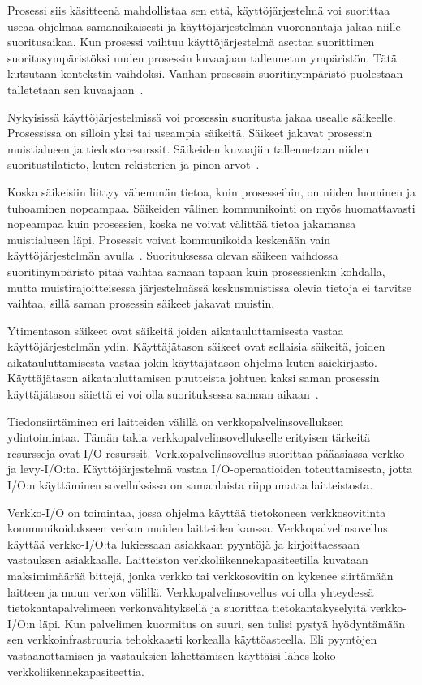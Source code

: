\documentclass[finnish]{tktltiki2}
\theoremstyle{definition}
\theoremstyle{remark}
\begin{document}
Prosessi siis käsitteenä mahdollistaa sen että, käyttöjärjestelmä
voi suorittaa useaa ohjelmaa samanaikaisesti ja käyttöjärjestelmän
vuoronantaja jakaa niille suoritusaikaa. Kun prosessi vaihtuu
käyttöjärjestelmä asettaa suorittimen suoritusympäristöksi
uuden prosessin kuvaajaan tallennetun ympäristön. Tätä kutsutaan kontekstin
vaihdoksi. Vanhan prosessin suoritinympäristö puolestaan talletetaan sen
kuvaajaan~\cite{stallings_operating_2018}.

Nykyisissä käyttöjärjestelmissä voi prosessin suoritusta jakaa usealle
säikeelle. Prosessissa on silloin yksi tai useampia säikeitä.
Säikeet jakavat prosessin muistialueen ja tiedostoresurssit.
Säikeiden kuvaajiin
tallennetaan niiden suoritustilatieto,
kuten rekisterien ja pinon arvot~\cite{stallings_operating_2018}.

Koska säikeisiin liittyy vähemmän tietoa, kuin prosesseihin,
on niiden luominen ja tuhoaminen nopeampaa. Säikeiden välinen
kommunikointi on myös huomattavasti nopeampaa kuin prosessien, koska
ne voivat välittää tietoa jakamansa muistialueen läpi.
Prosessit voivat kommunikoida keskenään vain käyttöjärjestelmän
avulla~\cite{stallings_operating_2018}.
Suorituksessa olevan säikeen
vaihdossa suoritinympäristö pitää vaihtaa
samaan tapaan kuin prosessienkin kohdalla, mutta muistirajoitteisessa
järjestelmässä keskusmuistissa olevia
tietoja ei tarvitse vaihtaa, sillä saman prosessin säikeet jakavat
muistin.

Ytimentason säikeet ovat säikeitä joiden aikatauluttamisesta vastaa
käyttöjärjestelmän ydin. Käyttäjätason säikeet ovat sellaisia säikeitä,
joiden aikatauluttamisesta vastaa jokin käyttäjätason ohjelma kuten
säiekirjasto. Käyttäjätason aikatauluttamisen puutteista johtuen
kaksi saman prosessin käyttäjätason säiettä ei voi olla suorituksessa
samaan aikaan~\cite{stallings_operating_2018}. 

Tiedonsiirtäminen eri laitteiden välillä on verkkopalvelinsovelluksen
ydintoimintaa.
Tämän takia verkkopalvelinsovellukselle erityisen tärkeitä resursseja ovat
I/O-resurssit.
Verkkopalvelinsovellus suorittaa pääasiassa verkko-ja levy-I/O:ta.
Käyttöjärjestelmä vastaa I/O-operaatioiden toteuttamisesta,
jotta I/O:n käyttäminen sovelluksissa on samanlaista
riippumatta laitteistosta.

Verkko-I/O on toimintaa, jossa ohjelma käyttää tietokoneen
verkkosovitinta kommunikoidakseen verkon muiden laitteiden kanssa.
Verkkopalvelinsovellus käyttää verkko-I/O:ta lukiessaan
asiakkaan pyyntöjä ja kirjoittaessaan vastauksen asiakkaalle.
Laitteiston verkkoliikennekapasiteetilla kuvataan maksimimäärää bittejä,
jonka verkko tai verkkosovitin on kykenee siirtämään laitteen ja muun
verkon välillä.
Verkkopalvelinsovellus voi olla yhteydessä tietokantapalvelimeen
verkonvälityksellä ja suorittaa tietokantakyselyitä verkko-I/O:n läpi.
Kun palvelimen kuormitus on suuri, sen tulisi pystyä hyödyntämään
sen verkkoinfrastruuria tehokkaasti korkealla käyttöasteella. Eli
pyyntöjen vastaanottamisen ja vastauksien lähettämisen käyttäisi
lähes koko verkkoliikennekapasiteettia.
\end{document}
